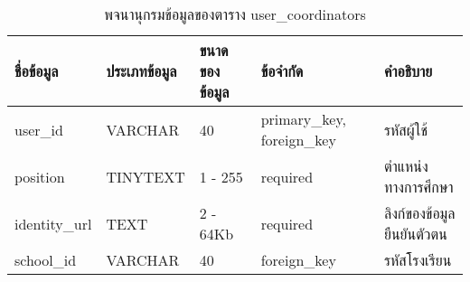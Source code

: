 \begin{table}[htbp]
    \caption{พจนานุกรมข้อมูลของตาราง user\_coordinators}
    \label{tab:database-user-coordinators}
    \begin{tabularx}{\textwidth}{ | p{1.75cm} | p{2.20cm} | p{2.45cm} | p{2cm} | X | }
    \hline
    \textbf{ชื่อข้อมูล} & \textbf{ประเภทข้อมูล} & \textbf{ขนาดของข้อมูล} & \textbf{ข้อจำกัด} & \textbf{คำอธิบาย} \\
    \hline
    user\_id & VARCHAR & 40 & primary\_key, foreign\_key & รหัสผู้ใช้ \\
    \hline
    position & TINYTEXT & 1 - 255 & required & ตำแหน่งทางการศึกษา \\
    \hline
    identity\_url & TEXT & 2 - 64Kb & required & ลิงก์ของข้อมูลยืนยันตัวตน \\
    \hline
    school\_id & VARCHAR & 40 & foreign\_key & รหัสโรงเรียน \\
    \hline
    \end{tabularx}
\end{table}
